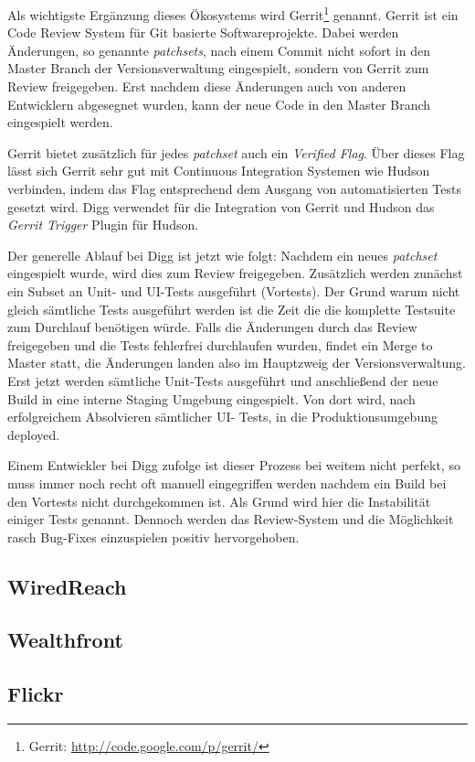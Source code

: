 Als wichtigste Ergänzung dieses Ökosystems wird Gerrit\footnote{Gerrit:
\url{http://code.google.com/p/gerrit/}} genannt. Gerrit ist ein Code Review
System für Git basierte Softwareprojekte. Dabei werden Änderungen, so genannte
\emph{patchsets}, nach einem Commit nicht sofort in den Master Branch der
Versionsverwaltung eingespielt, sondern von Gerrit zum Review freigegeben.
Erst nachdem diese Änderungen auch von anderen Entwicklern abgesegnet wurden,
kann der neue Code in den Master Branch eingespielt werden. 

Gerrit bietet zusätzlich für jedes \emph{patchset} auch ein \emph{Verified
Flag}. Über dieses Flag lässt sich Gerrit sehr gut mit Continuous Integration
Systemen wie Hudson verbinden, indem das Flag entsprechend dem Ausgang von
automatisierten Tests gesetzt wird. Digg verwendet für die Integration von
Gerrit und Hudson das \emph{Gerrit Trigger} Plugin für Hudson.

Der generelle Ablauf bei Digg ist jetzt wie folgt: Nachdem ein neues
\emph{patchset} eingespielt wurde, wird dies zum Review freigegeben.
Zusätzlich werden zunächst ein Subset an Unit- und UI-Tests ausgeführt
(Vortests). Der Grund warum nicht gleich sämtliche Tests ausgeführt werden ist
die Zeit die die komplette Testsuite zum Durchlauf benötigen würde. Falls die
Änderungen durch das Review freigegeben und die Tests fehlerfrei durchlaufen
wurden, findet ein Merge to Master statt, die Änderungen landen also im
Hauptzweig der Versionsverwaltung. Erst jetzt werden sämtliche Unit-Tests
ausgeführt und anschließend der neue Build in eine interne Staging Umgebung
eingespielt. Von dort wird, nach erfolgreichem Absolvieren sämtlicher UI-
Tests, in die Produktionsumgebung deployed.

Einem Entwickler bei Digg zufolge \cite{digg4} ist dieser Prozess bei weitem 
nicht perfekt, so muss immer noch recht oft manuell eingegriffen werden nachdem
ein Build bei den Vortests nicht durchgekommen ist. Als Grund wird hier die 
Instabilität einiger Tests genannt. Dennoch werden das Review-System und die 
Möglichkeit rasch Bug-Fixes einzuspielen positiv hervorgehoben.

\subsection{WiredReach}

\subsection{Wealthfront}

\subsection{Flickr}
